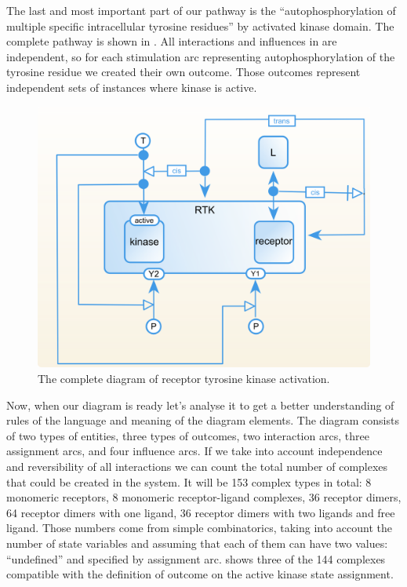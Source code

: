 The last and most important part of our pathway is the ``autophosphorylation of multiple specific intracellular tyrosine residues'' by activated kinase domain. The complete pathway is shown in . All interactions and influences in \SBGNERLone are independent, so for each stimulation arc representing autophosphorylation of the tyrosine residue we created their own outcome. Those outcomes represent independent sets of instances where kinase is active.

\begin{figure}[H]
  \centering
  \vspace*{-0.75em}
  \includegraphics[scale=0.75]{examples/rtk.png}
   \caption{The complete diagram of receptor tyrosine kinase activation.}
  \label{fig:rtk-full}
\end{figure}

Now, when our diagram is ready let's analyse it to get a better understanding of rules of the language and meaning of the diagram elements. The diagram consists of two types of entities, three types of outcomes, two interaction arcs, three assignment arcs, and four influence arcs. If we take into account independence and reversibility of all interactions we can count the total number of complexes that could be created in the system. It will be 153 complex types in total: 8 monomeric receptors, 8 monomeric receptor-ligand complexes, 36 receptor dimers, 64 receptor dimers with one ligand, 36 receptor dimers with two ligands and free ligand. Those numbers come from simple combinatorics, taking into account the number of state variables and assuming that each of them can have two values: ``undefined'' and specified by assignment arc.  shows three of the 144 complexes compatible with the definition of outcome on the active kinase state assignment.

